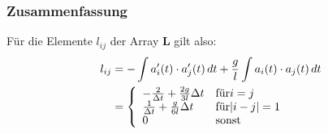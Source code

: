 \subsubsection{Zusammenfassung} %
Für die Elemente $l_{ij}$ der Array $\mathbf{L}$ gilt also:
\begin{equation}
    \begin{aligned}
        l_{ij} 
        &= - \int a_i'(t) \cdot a_j'(t) \, d t + \frac{g}{l} \int a_i(t) \cdot a_j(t) \, d t \\
        &=  \left\{ 
                \begin{array}{ll}
                    - \frac{2}{\Delta t} + \frac{2g}{3l} \Delta t & \mbox{für} i = j \\
                    \frac{1}{\Delta t} + \frac{g}{6l} \Delta t & \mbox{für} |i - j| = 1 \\
                    0 & \mbox{sonst}
                \end{array} 
            \right.
    \end{aligned}
\end{equation}
